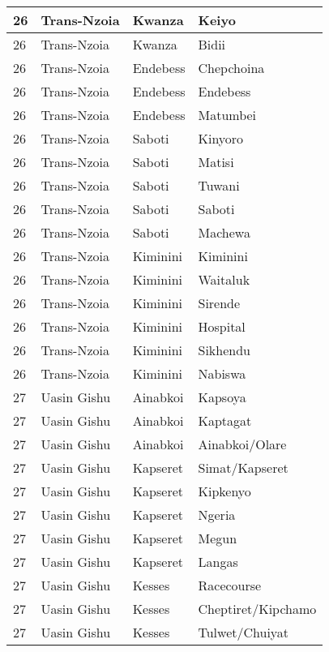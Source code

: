 \begin{table}[!ht]
\begin{tabular}{|l|l|l|l|}
        26 & Trans-Nzoia & Kwanza & Keiyo \\ \hline
        26 & Trans-Nzoia & Kwanza & Bidii \\ \hline
        26 & Trans-Nzoia & Endebess & Chepchoina \\ \hline
        26 & Trans-Nzoia & Endebess & Endebess \\ \hline
        26 & Trans-Nzoia & Endebess & Matumbei \\ \hline
        26 & Trans-Nzoia & Saboti & Kinyoro \\ \hline
        26 & Trans-Nzoia & Saboti & Matisi \\ \hline
        26 & Trans-Nzoia & Saboti & Tuwani \\ \hline
        26 & Trans-Nzoia & Saboti & Saboti \\ \hline
        26 & Trans-Nzoia & Saboti & Machewa \\ \hline
        26 & Trans-Nzoia & Kiminini & Kiminini \\ \hline
        26 & Trans-Nzoia & Kiminini & Waitaluk \\ \hline
        26 & Trans-Nzoia & Kiminini & Sirende \\ \hline
        26 & Trans-Nzoia & Kiminini & Hospital \\ \hline
        26 & Trans-Nzoia & Kiminini & Sikhendu \\ \hline
        26 & Trans-Nzoia & Kiminini & Nabiswa \\ \hline
        27 & Uasin Gishu & Ainabkoi & Kapsoya \\ \hline
        27 & Uasin Gishu & Ainabkoi & Kaptagat \\ \hline
        27 & Uasin Gishu & Ainabkoi & Ainabkoi/Olare \\ \hline
        27 & Uasin Gishu & Kapseret & Simat/Kapseret \\ \hline
        27 & Uasin Gishu & Kapseret & Kipkenyo \\ \hline
        27 & Uasin Gishu & Kapseret & Ngeria \\ \hline
        27 & Uasin Gishu & Kapseret & Megun \\ \hline
        27 & Uasin Gishu & Kapseret & Langas \\ \hline
        27 & Uasin Gishu & Kesses & Racecourse \\ \hline
        27 & Uasin Gishu & Kesses & Cheptiret/Kipchamo \\ \hline
        27 & Uasin Gishu & Kesses & Tulwet/Chuiyat \\ \hline

\end{tabular}
\end{table}
